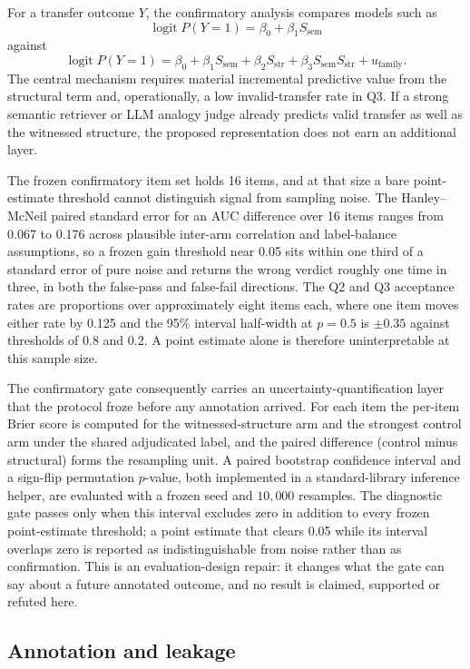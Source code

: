 For a transfer outcome $Y$, the confirmatory analysis compares models such as
\[
\operatorname{logit}P(Y=1)=\beta_0+\beta_1 S_{\mathrm{sem}}
\]
against
\[
\operatorname{logit}P(Y=1)=\beta_0+\beta_1 S_{\mathrm{sem}}+\beta_2 S_{\mathrm{str}}+\beta_3S_{\mathrm{sem}}S_{\mathrm{str}}+u_{\mathrm{family}}.
\]
The central mechanism requires material incremental predictive value from the structural term and, operationally, a low invalid-transfer rate in Q3. If a strong semantic retriever or LLM analogy judge already predicts valid transfer as well as the witnessed structure, the proposed representation does not earn an additional layer.

The frozen confirmatory item set holds 16 items, and at that size a bare point-estimate threshold cannot distinguish signal from sampling noise. The Hanley--McNeil paired standard error for an AUC difference over 16 items ranges from 0.067 to 0.176 across plausible inter-arm correlation and label-balance assumptions, so a frozen gain threshold near 0.05 sits within one third of a standard error of pure noise and returns the wrong verdict roughly one time in three, in both the false-pass and false-fail directions. The Q2 and Q3 acceptance rates are proportions over approximately eight items each, where one item moves either rate by 0.125 and the 95\% interval half-width at $p=0.5$ is $\pm 0.35$ against thresholds of 0.8 and 0.2. A point estimate alone is therefore uninterpretable at this sample size.

The confirmatory gate consequently carries an uncertainty-quantification layer that the protocol froze before any annotation arrived. For each item the per-item Brier score is computed for the witnessed-structure arm and the strongest control arm under the shared adjudicated label, and the paired difference (control minus structural) forms the resampling unit. A paired bootstrap confidence interval and a sign-flip permutation $p$-value, both implemented in a standard-library inference helper, are evaluated with a frozen seed and $10{,}000$ resamples. The diagnostic gate passes only when this interval excludes zero in addition to every frozen point-estimate threshold; a point estimate that clears 0.05 while its interval overlaps zero is reported as indistinguishable from noise rather than as confirmation. This is an evaluation-design repair: it changes what the gate can say about a future annotated outcome, and no result is claimed, supported or refuted here.

\subsection{Annotation and leakage}


